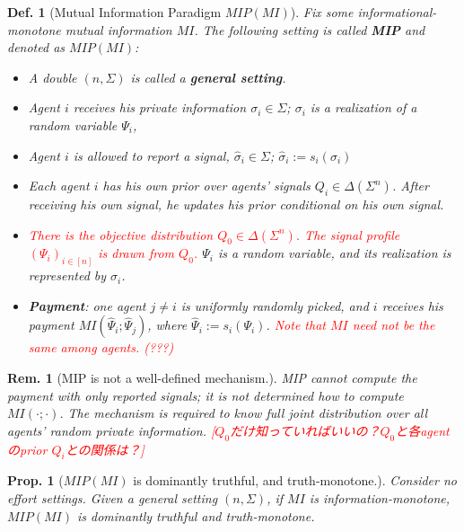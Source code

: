 \documentclass[11pt,a4paper,dvipdfmx]{article}
\theoremstyle{plain}
\newtheorem{prop}{Prop.}[section]
\newtheorem{df}{Def.}[section]
\newtheorem{rem}{Rem.}[section]
\renewcommand{\hat}{\widehat}
\newcommand{\1}{\mathbbm{1}}
\newcommand{\ocomment}[1]{{\textcolor{red}{#1}}}
\begin{document}
\begin{df}[Mutual Information Paradigm $MIP(MI)$]
	Fix some informational-monotone mutual information $MI$. The following setting is called \textbf{MIP} and denoted as $MIP(MI)$:
	\begin{itemize}
	\item A double $(n, \Sigma)$ is called a \textbf{general setting}.
	\item Agent $i$ receives his private information $\sigma_i \in \Sigma$; $\sigma_i$ is a realization of a random variable $\Psi_i$,
	\item Agent $i$ is allowed to report a signal, $\hat{\sigma}_i \in \Sigma$; $\hat{\sigma}_i := s_i(\sigma_i)$
	\item Each agent $i$ has his own prior over agents' signals $Q_i \in \Delta(\Sigma^{n})$. After receiving his own signal, he updates his prior conditional on his own signal.
	\item \ocomment{There is the objective distribution $Q_0 \in \Delta(\Sigma^{n})$. The signal profile $(\Psi_i)_{i \in [n]}$ is drawn from $Q_0$.} $\Psi_i$ is a random variable, and its realization is represented by $\sigma_i$.
	\item \textbf{Payment}: one agent $j \neq i$ is uniformly randomly picked, and $i$ receives his payment $MI(\hat{\Psi}_i; \hat{\Psi}_j)$, where $\hat{\Psi}_i := s_i(\Psi_i)$. \ocomment{Note that $MI$ need not be the same among agents. (???)}
\end{itemize}
\end{df}
\begin{rem}[MIP is not a well-defined mechanism.]
	MIP cannot compute the payment with only reported signals; it is not determined how to compute $MI(\cdot; \cdot)$. The mechanism is required to know full joint distribution over all agents' random private information. \ocomment{[$Q_0$だけ知っていればいいの？$Q_0$と各agentのprior $Q_i$との関係は？]}
\end{rem}

\begin{screen}
	\begin{prop}[$MIP(MI)$ is dominantly truthful, and truth-monotone.] \label{prop_mip_noeffort}
	Consider no effort settings. Given a general setting $(n, \Sigma)$, if $MI$ is information-monotone, $MIP(MI)$ is dominantly truthful and truth-monotone.
	\end{prop}
\end{screen}
\end{document}
